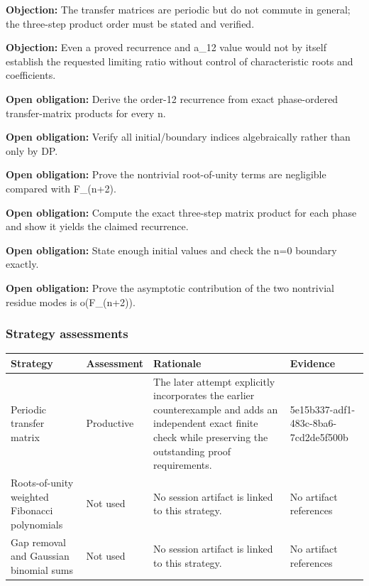 \documentclass[11pt]{article}
\begin{document}
\textbf{Objection:} The transfer matrices are periodic but do not commute in general; the three-step product order must be stated and verified.\par
\textbf{Objection:} Even a proved recurrence and a\_12 value would not by itself establish the requested limiting ratio without control of characteristic roots and coefficients.\par
\textbf{Open obligation:} Derive the order-12 recurrence from exact phase-ordered transfer-matrix products for every n.\par
\textbf{Open obligation:} Verify all initial/boundary indices algebraically rather than only by DP.\par
\textbf{Open obligation:} Prove the nontrivial root-of-unity terms are negligible compared with F\_(n+2).\par
\textbf{Open obligation:} Compute the exact three-step matrix product for each phase and show it yields the claimed recurrence.\par
\textbf{Open obligation:} State enough initial values and check the n=0 boundary exactly.\par
\textbf{Open obligation:} Prove the asymptotic contribution of the two nontrivial residue modes is o(F\_(n+2)).\par
\subsubsection*{Strategy assessments}
\begin{longtable}{>{\raggedright\arraybackslash}p{.16\linewidth}>{\raggedright\arraybackslash}p{.15\linewidth}>{\raggedright\arraybackslash}p{.40\linewidth}>{\raggedright\arraybackslash}p{.17\linewidth}}
\toprule Strategy & Assessment & Rationale & Evidence \\
\midrule\endhead
Periodic transfer matrix & Productive & The later attempt explicitly incorporates the earlier counterexample and adds an independent exact finite check while preserving the outstanding proof requirements. & 5e15b337-adf1-483c-8ba6-7cd2de5f500b \\
Roots-of-unity weighted Fibonacci polynomials & Not used & No session artifact is linked to this strategy. & No artifact references \\
Gap removal and Gaussian binomial sums & Not used & No session artifact is linked to this strategy. & No artifact references \\
\bottomrule
\end{longtable}
\end{document}
